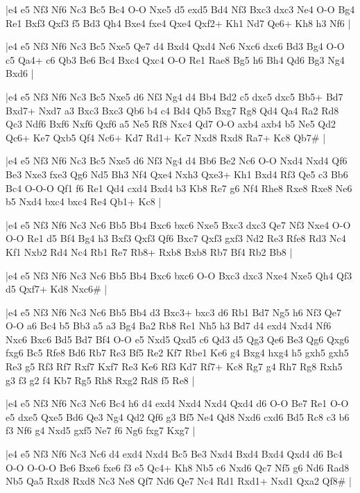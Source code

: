 \whitename{}
\blackname{}
\makegametitle
|e4 e5 Nf3 Nf6 Nc3 Bc5 Bc4 O-O Nxe5 d5 exd5 Bd4 Nf3 Bxc3 dxc3 Ne4 O-O Bg4 Re1 Bxf3 Qxf3 f5 Bd3 Qh4 Bxe4 fxe4 Qxe4 Qxf2+ Kh1 Nd7 Qe6+ Kh8 h3 Nf6  |

\whitename{}
\blackname{}
\makegametitle
|e4 e5 Nf3 Nf6 Nc3 Bc5 Nxe5 Qe7 d4 Bxd4 Qxd4 Nc6 Nxc6 dxc6 Bd3 Bg4 O-O c5 Qa4+ c6 Qb3 Be6 Bc4 Bxc4 Qxc4 O-O Re1 Rae8 Bg5 h6 Bh4 Qd6 Bg3 Ng4 Bxd6  |

\whitename{}
\blackname{}
\makegametitle
|e4 e5 Nf3 Nf6 Nc3 Bc5 Nxe5 d6 Nf3 Ng4 d4 Bb4 Bd2 c5 dxc5 dxc5 Bb5+ Bd7 Bxd7+ Nxd7 a3 Bxc3 Bxc3 Qb6 b4 c4 Bd4 Qb5 Bxg7 Rg8 Qd4 Qa4 Ra2 Rd8 Qc3 Ndf6 Bxf6 Nxf6 Qxf6 a5 Ne5 Rf8 Nxc4 Qd7 O-O axb4 axb4 b5 Ne5 Qd2 Qc6+ Ke7 Qxb5 Qf4 Nc6+ Kd7 Rd1+ Kc7 Nxd8 Rxd8 Ra7+ Kc8 Qb7\#  |

\whitename{}
\blackname{}
\makegametitle
|e4 e5 Nf3 Nf6 Nc3 Bc5 Nxe5 d6 Nf3 Ng4 d4 Bb6 Be2 Nc6 O-O Nxd4 Nxd4 Qf6 Be3 Nxe3 fxe3 Qg6 Nd5 Bh3 Nf4 Qxe4 Nxh3 Qxe3+ Kh1 Bxd4 Rf3 Qe5 c3 Bb6 Bc4 O-O-O Qf1 f6 Re1 Qd4 cxd4 Bxd4 b3 Kb8 Re7 g6 Nf4 Rhe8 Rxe8 Rxe8 Ne6 b5 Nxd4 bxc4 bxc4 Re4 Qb1+ Kc8  |

\whitename{}
\blackname{}
\makegametitle
|e4 e5 Nf3 Nf6 Nc3 Nc6 Bb5 Bb4 Bxc6 bxc6 Nxe5 Bxc3 dxc3 Qe7 Nf3 Nxe4 O-O O-O Re1 d5 Bf4 Bg4 h3 Bxf3 Qxf3 Qf6 Bxc7 Qxf3 gxf3 Nd2 Re3 Rfe8 Rd3 Nc4 Kf1 Nxb2 Rd4 Nc4 Rb1 Re7 Rb8+ Rxb8 Bxb8 Rb7 Bf4 Rb2 Bb8  |

\whitename{}
\blackname{}
\makegametitle
|e4 e5 Nf3 Nf6 Nc3 Nc6 Bb5 Bb4 Bxc6 bxc6 O-O Bxc3 dxc3 Nxe4 Nxe5 Qh4 Qf3 d5 Qxf7+ Kd8 Nxc6\#  |

\whitename{}
\blackname{}
\makegametitle
|e4 e5 Nf3 Nf6 Nc3 Nc6 Bb5 Bb4 d3 Bxc3+ bxc3 d6 Rb1 Bd7 Ng5 h6 Nf3 Qe7 O-O a6 Bc4 b5 Bb3 a5 a3 Bg4 Ba2 Rb8 Re1 Nh5 h3 Bd7 d4 exd4 Nxd4 Nf6 Nxc6 Bxc6 Bd5 Bd7 Bf4 O-O e5 Nxd5 Qxd5 c6 Qd3 d5 Qg3 Qe6 Be3 Qg6 Qxg6 fxg6 Bc5 Rfe8 Bd6 Rb7 Re3 Bf5 Re2 Kf7 Rbe1 Ke6 g4 Bxg4 hxg4 h5 gxh5 gxh5 Re3 g5 Rf3 Rf7 Rxf7 Kxf7 Re3 Ke6 Rf3 Kd7 Rf7+ Kc8 Rg7 g4 Rh7 Rg8 Rxh5 g3 f3 g2 f4 Kb7 Rg5 Rh8 Rxg2 Rd8 f5 Re8  |

\whitename{}
\blackname{}
\makegametitle
|e4 e5 Nf3 Nf6 Nc3 Nc6 Bc4 h6 d4 exd4 Nxd4 Nxd4 Qxd4 d6 O-O Be7 Re1 O-O e5 dxe5 Qxe5 Bd6 Qe3 Ng4 Qd2 Qf6 g3 Bf5 Ne4 Qd8 Nxd6 cxd6 Bd5 Rc8 c3 b6 f3 Nf6 g4 Nxd5 gxf5 Ne7 f6 Ng6 fxg7 Kxg7  |

\whitename{}
\blackname{}
\makegametitle
|e4 e5 Nf3 Nf6 Nc3 Nc6 d4 exd4 Nxd4 Bc5 Be3 Nxd4 Bxd4 Bxd4 Qxd4 d6 Bc4 O-O O-O-O Be6 Bxe6 fxe6 f3 e5 Qc4+ Kh8 Nb5 c6 Nxd6 Qc7 Nf5 g6 Nd6 Rad8 Nb5 Qa5 Rxd8 Rxd8 Nc3 Ne8 Qf7 Nd6 Qe7 Nc4 Rd1 Rxd1+ Nxd1 Qxa2 Qf8\#  |

